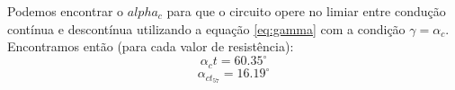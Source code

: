 \documentclass{article}
\begin{document}
Podemos encontrar o $alpha_c$ para que o circuito opere no limiar entre condução contínua e descontínua utilizando a equação \ref{eq:gamma} com a condição $\gamma = \alpha_c$. Encontramos então (para cada valor de resistência):
\begin{equation}
\alpha_ct = 60.35^\circ
\end{equation}
\begin{equation}
\alpha_{ct_{57}} = 16.19^\circ
\end{equation}



\end{document}
